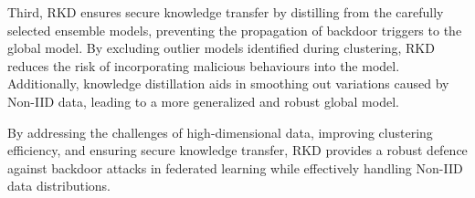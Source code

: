 Third, RKD ensures secure knowledge transfer by distilling from the carefully selected ensemble models, preventing the propagation of backdoor triggers to the global model. By excluding outlier models identified during clustering, RKD reduces the risk of incorporating malicious behaviours into the model. Additionally, knowledge distillation aids in smoothing out variations caused by Non-IID data, leading to a more generalized and robust global model.

By addressing the challenges of high-dimensional data, improving clustering efficiency, and ensuring secure knowledge transfer, RKD provides a robust defence against backdoor attacks in federated learning while effectively handling Non-IID data distributions.